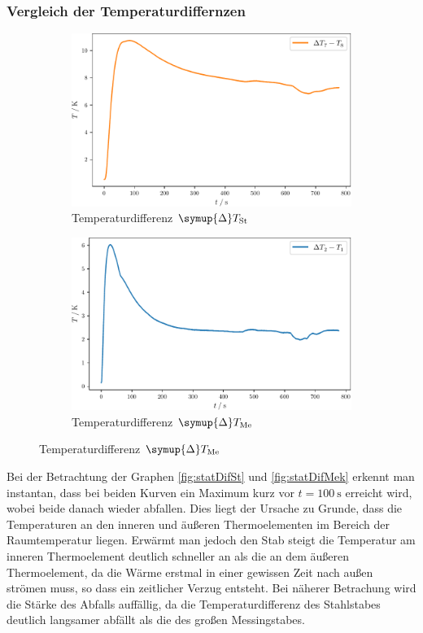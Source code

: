 \subsubsection{Vergleich der Temperaturdiffernzen}
\begin{figure}
  \begin{subfigure}{0.48\textwidth}
    \centering
    \includegraphics[width = \textwidth]{build/statDifSt.pdf}
    \caption{Temperaturdifferenz $\symup{\Delta}T_\text{St}$}
    \label{fig:statDifSt}
  \end{subfigure}
  \begin{subfigure}{0.48\textwidth}
    \centering
    \includegraphics[width = \textwidth]{build/statDifMek.pdf}
    \caption{Temperaturdifferenz $\symup{\Delta}T_\text{Me}$}
    \label{fig:statDifMek}
  \end{subfigure}
\end{figure}
Bei der Betrachtung der Graphen \eqref{fig:statDifSt} und \eqref{fig:statDifMek} erkennt man instantan, dass bei beiden
Kurven ein Maximum kurz vor $t = \SI{100}{\second}$ erreicht wird, wobei beide danach 
wieder abfallen. Dies liegt der Ursache zu Grunde, dass die Temperaturen an den inneren und äußeren Thermoelementen im Bereich der Raumtemperatur liegen. 
Erwärmt man jedoch den Stab steigt die Temperatur am inneren  Thermoelement deutlich schneller an als die an dem äußeren Thermoelement, da die Wärme erstmal
in einer gewissen Zeit nach außen strömen muss, so dass ein zeitlicher Verzug entsteht. Bei näherer Betrachung wird die Stärke des Abfalls auffällig, da die
Temperaturdifferenz des Stahlstabes deutlich langsamer abfällt als die des großen Messingstabes. 
